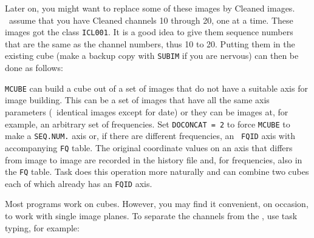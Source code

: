      Later on, you might want to replace some of these images by
Cleaned images.  \Eg\ assume that you have Cleaned channels 10 through
20, one at a time.  These images got the class {\tt ICL001}\@.  It is
a good idea to give them sequence numbers that are the same as the
channel numbers, thus 10 to 20.  Putting them in the existing cube
(make a backup copy with {\tt SUBIM} if you are nervous) can then be
done as follows:

{\tt MCUBE} can build a cube out of a set of images that do not have a
suitable axis for image building.  This can be a set of images that
have all the same axis parameters (\eg\ identical images except for
date) or they can be images at, for example, an arbitrary set of
frequencies.  Set {\tt DOCONCAT = 2} to force {\tt MCUBE} to make a
{\tt SEQ.NUM.} axis or, if there are different frequencies, an {\tt
FQID} axis with accompanying {\tt FQ} table.  The original coordinate
values on an axis that differs from image to image are recorded in the
history file and, for frequencies, also in the {\tt FQ} table.  Task
{\tt {}} does this operation more naturally and can combine
two cubes each of which already has an {\tt FQID} axis.

     Most programs work on cubes.  However, you may find it
convenient, on occasion, to work with single image planes.  To
separate the channels from the , use task {\tt
{}} typing, for example:

